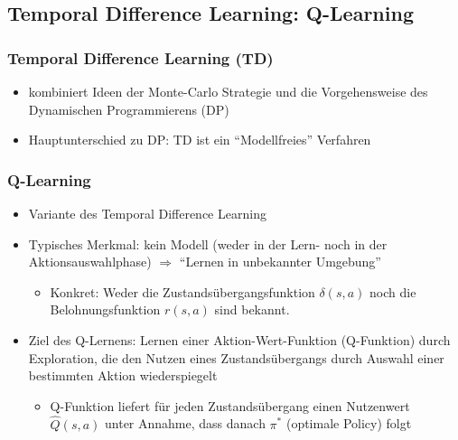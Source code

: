 \subsection{Temporal Difference Learning: Q-Learning}

\begin{frame}
  \frametitle{Temporal Difference Learning (TD)}
  \begin{itemize}
    \item kombiniert Ideen der Monte-Carlo Strategie und die Vorgehensweise des
    Dynamischen Programmierens (DP)
    \item Hauptunterschied zu DP: TD ist ein "`Modellfreies"' Verfahren 
  \end{itemize}
\end{frame}

\begin{frame}
  \frametitle{Q-Learning}
  \begin{itemize}
     \item Variante des Temporal Difference Learning
     \item Typisches Merkmal: kein Modell (weder in der Lern- noch in der 
     Aktionsauswahlphase) $\Rightarrow$ "`Lernen in unbekannter Umgebung"'
     \begin{itemize}
       \item Konkret: Weder die Zustandsübergangsfunktion $\delta(s,a)$ noch die
       Belohnungsfunktion $r(s,a)$ sind bekannt.
     \end{itemize}
     \item Ziel des Q-Lernens: Lernen einer Aktion-Wert-Funktion (Q-Funktion)
     durch Exploration, die den Nutzen eines Zustandsübergangs durch Auswahl einer
     bestimmten Aktion wiederspiegelt
     \begin{itemize}
       \item Q-Funktion liefert für jeden Zustandsübergang einen Nutzenwert
       $\hat{Q}(s,a)$ unter Annahme, dass danach $\pi^*$ (optimale Policy) folgt
     \end{itemize}
  \end{itemize}
\end{frame}

